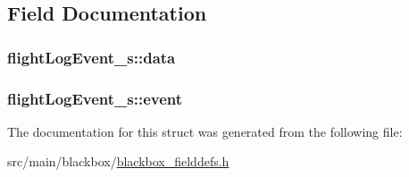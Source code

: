 \subsection{Field Documentation}
\hypertarget{structflightLogEvent__s_a64a0a11339c309f780f20c8401477ac2}{
\subsubsection[{data}]{ flight\+Log\+Event\+\_\+s\+::data}}\label{structflightLogEvent__s_a64a0a11339c309f780f20c8401477ac2}
\hypertarget{structflightLogEvent__s_ac1a26453ad18bfacafd36354e286d0bf}{
\subsubsection[{event}]{ flight\+Log\+Event\+\_\+s\+::event}}\label{structflightLogEvent__s_ac1a26453ad18bfacafd36354e286d0bf}


The documentation for this struct was generated from the following file\+:\begin{DoxyCompactItemize}
\item 
src/main/blackbox/\hyperlink{blackbox__fielddefs_8h}{blackbox\+\_\+fielddefs.\+h}\end{DoxyCompactItemize}
